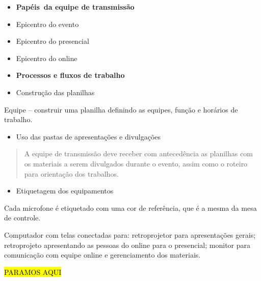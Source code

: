 \documentclass[
]{book}
\providecommand{\tightlist}{%
  \setlength{\itemsep}{0pt}\setlength{\parskip}{0pt}}
\begin{document}
\begin{itemize}
\tightlist
\item
  \textbf{Papéis~da equipe de transmissão}
\end{itemize}

\begin{itemize}
\item
  Epicentro do evento~
\item
  Epicentro do presencial~
\end{itemize}

\begin{itemize}
\tightlist
\item
  Epicentro do online~
\end{itemize}

\begin{itemize}
\tightlist
\item
  \textbf{Processos e fluxos de trabalho~}
\end{itemize}

\begin{itemize}
\tightlist
\item
  Construção das planilhas~
\end{itemize}

Equipe -- construir uma planilha definindo as equipes, função e horários
de trabalho.

\begin{itemize}
\tightlist
\item
  Uso das pastas de apresentações e divulgações
\end{itemize}

\begin{quote}
A equipe de transmissão deve receber com antecedência as planilhas com
os materiais a serem divulgados durante o evento, assim como o roteiro
para orientação dos trabalhos.
\end{quote}

\begin{itemize}
\tightlist
\item
  Etiquetagem dos equipamentos~
\end{itemize}

Cada microfone é etiquetado com uma cor de referência, que é a mesma da
mesa de controle.

Computador com telas conectadas para: retroprojetor para apresentações
gerais; retroprojeto apresentando as pessoas do online para o
presencial; monitor para comunicação com equipe online e gerenciamento
dos materiais. ~

\hl{PARAMOS AQUI}
\end{document}

